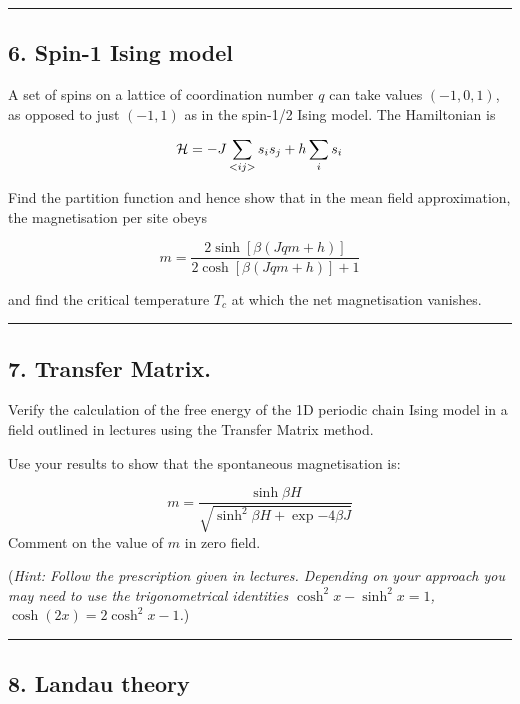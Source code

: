 \documentclass[
  letterpaper,
  DIV=11,
  numbers=noendperiod]{scrreprt}
\begin{document}
\begin{center}\rule{0.5\linewidth}{0.5pt}\end{center}

\subsection*{6. Spin-1 Ising model}\label{spin-1-ising-model}

A set of spins on a lattice of coordination number \(q\) can take values
\((-1,0,1)\), as opposed to just \((-1,1)\) as in the spin-1/2 Ising
model. The Hamiltonian is

\[{\cal H}=-J\sum_{<ij>}s_is_j + h\sum_i s_i\]

Find the partition function and hence show that in the mean field
approximation, the magnetisation per site obeys

\[m=\frac{2\sinh[\beta(Jqm+h)]}{2\cosh[\beta(Jqm+h)]+1}\]

and find the critical temperature \(T_c\) at which the net magnetisation
vanishes.

\begin{center}\rule{0.5\linewidth}{0.5pt}\end{center}

\subsection*{7. Transfer Matrix.}\label{transfer-matrix.}

Verify the calculation of the free energy of the 1D periodic chain Ising
model in a field outlined in lectures using the Transfer Matrix method.

Use your results to show that the spontaneous magnetisation is:

\[m=\frac{\sinh \beta H}{\sqrt{\sinh^2\beta H+\exp{-4\beta J}}}\]
Comment on the value of \(m\) in zero field.

(\emph{Hint: Follow the prescription given in lectures. Depending on
your approach you may need to use the trigonometrical identities
\(\cosh^2x-\sinh^2x=1\), \(\cosh(2x)=2\cosh^2x-1\).})

\begin{center}\rule{0.5\linewidth}{0.5pt}\end{center}

\subsection*{8. Landau theory}\label{landau-theory}
\end{document}
